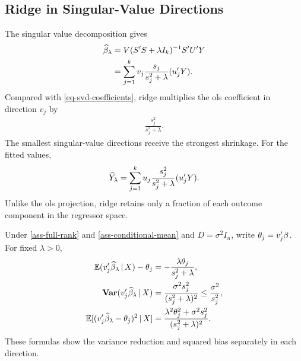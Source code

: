 \documentclass[a4paper,12pt]{article}
\begin{document}
\subsection{Ridge in Singular-Value Directions}

The singular value decomposition gives
\begin{align}\label{eq-ridge-svd}
	\widehat\beta_\lambda
	&=V(S^{\prime} S+\lambda I_k)^{-1} S^{\prime} U^{\prime} Y\\
	&=\sum_{j=1}^k v_j\frac{s_j}{s_j^2+\lambda}(u_j^{\prime} Y).
\end{align}
Compared with \eqref{eq-svd-coefficients}, ridge multiplies the \gls{ols} coefficient in direction $v_j$ by
\begin{align*}
	\frac{s_j^2}{s_j^2+\lambda}.
\end{align*}
The smallest singular-value directions receive the strongest shrinkage.
For the fitted values,
\begin{align*}
	\widehat Y_\lambda
	=\sum_{j=1}^k u_j\frac{s_j^2}{s_j^2+\lambda}(u_j^{\prime} Y).
\end{align*}
Unlike the \gls{ols} projection, ridge retains only a fraction of each outcome component in the regressor space.

\begin{remark}
	Under \autoref{ass-full-rank} and \autoref{ass-conditional-mean} and $D=\sigma^2 I_n$, write $\theta_j=v_j^{\prime}\beta$.
	For fixed $\lambda>0$,
	\begin{align*}
		\operatorname{\mathbb{E}}(v_j^{\prime}\widehat\beta_\lambda\mathpunct{}|\mathpunct{} X)-\theta_j
		&=-\frac{\lambda\theta_j}{s_j^2+\lambda},\\
		\operatorname{\text{\textrm{\upshape\textbf{Var}}}}(v_j^{\prime}\widehat\beta_\lambda\mathpunct{}|\mathpunct{} X)
		&=\frac{\sigma^2s_j^2}{(s_j^2+\lambda)^2}
		\le\frac{\sigma^2}{s_j^2},\\
		\operatorname{\mathbb{E}}[(v_j^{\prime}\widehat\beta_\lambda-\theta_j)^2\mathpunct{}|\mathpunct{} X]
		&=\frac{\lambda^2\theta_j^2+\sigma^2s_j^2}{(s_j^2+\lambda)^2}.
	\end{align*}
	These formulas show the variance reduction and squared bias separately in each direction.
\end{remark}
\end{document}
